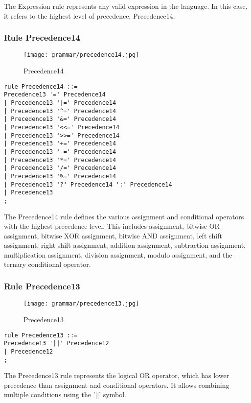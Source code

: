 The Expression rule represents any valid expression in the language. In this case, it refers to the highest level of precedence, Precedence14.

\subsubsection*{Rule Precedence14}

\begin{figure}[!ht]
\centering
\texttt{[image: grammar/precedence14.jpg]}
\caption{Precedence14}
\end{figure}

\begin{lstlisting}
rule Precedence14 ::=
Precedence13 '=' Precedence14
| Precedence13 '|=' Precedence14
| Precedence13 '^=' Precedence14
| Precedence13 '&=' Precedence14
| Precedence13 '<<=' Precedence14
| Precedence13 '>>=' Precedence14
| Precedence13 '+=' Precedence14
| Precedence13 '-=' Precedence14
| Precedence13 '*=' Precedence14
| Precedence13 '/=' Precedence14
| Precedence13 '%=' Precedence14
| Precedence13 '?' Precedence14 ':' Precedence14
| Precedence13
;
\end{lstlisting}

The Precedence14 rule defines the various assignment and conditional operators with the highest precedence level. This includes assignment, bitwise OR assignment, bitwise XOR assignment, bitwise AND assignment, left shift assignment, right shift assignment, addition assignment, subtraction assignment, multiplication assignment, division assignment, modulo assignment, and the ternary conditional operator.

\subsubsection*{Rule Precedence13}

\begin{figure}[!ht]
\centering
\texttt{[image: grammar/precedence13.jpg]}
\caption{Precedence13}
\end{figure}

\begin{lstlisting}
rule Precedence13 ::=
Precedence13 '||' Precedence12
| Precedence12
;
\end{lstlisting}

The Precedence13 rule represents the logical OR operator, which has lower precedence than assignment and conditional operators. It allows combining multiple conditions using the '||' symbol.

